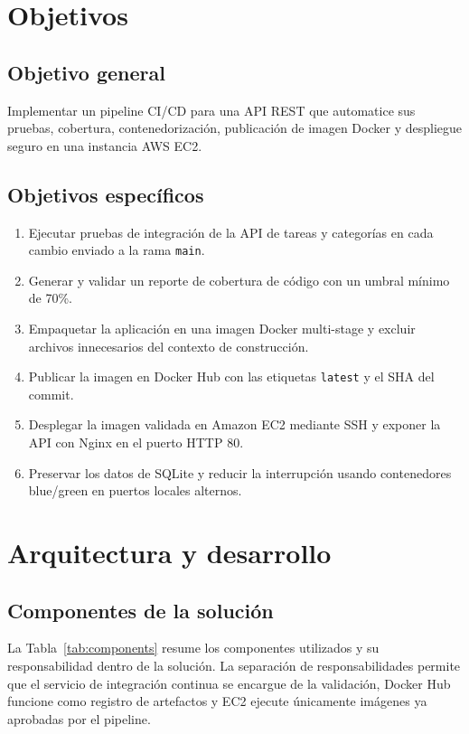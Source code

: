\documentclass[12pt,a4paper]{report}
\begin{document}
\chapter{Objetivos}

\section{Objetivo general}
Implementar un pipeline CI/CD para una API REST que automatice sus pruebas, cobertura, contenedorización, publicación de imagen Docker y despliegue seguro en una instancia AWS EC2.

\section{Objetivos específicos}
\begin{enumerate}[label=\arabic*.]
  \item Ejecutar pruebas de integración de la API de tareas y categorías en cada cambio enviado a la rama \texttt{main}.
  \item Generar y validar un reporte de cobertura de código con un umbral mínimo de 70\%.
  \item Empaquetar la aplicación en una imagen Docker multi-stage y excluir archivos innecesarios del contexto de construcción.
  \item Publicar la imagen en Docker Hub con las etiquetas \texttt{latest} y el SHA del commit.
  \item Desplegar la imagen validada en Amazon EC2 mediante SSH y exponer la API con Nginx en el puerto HTTP 80.
  \item Preservar los datos de SQLite y reducir la interrupción usando contenedores blue/green en puertos locales alternos.
\end{enumerate}

\chapter{Arquitectura y desarrollo}

\section{Componentes de la solución}

La Tabla~\ref{tab:components} resume los componentes utilizados y su responsabilidad dentro de la solución. La separación de responsabilidades permite que el servicio de integración continua se encargue de la validación, Docker Hub funcione como registro de artefactos y EC2 ejecute únicamente imágenes ya aprobadas por el pipeline.
\end{document}

